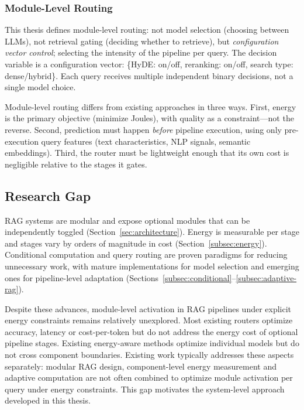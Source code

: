 
\subsubsection{Module-Level Routing}

This thesis defines module-level routing: not model selection (choosing between LLMs),
not retrieval gating (deciding whether to retrieve), but \emph{configuration 
vector control}; selecting the intensity of the pipeline per query. The decision 
variable is a configuration vector: \{HyDE: on/off, reranking: on/off, search type: 
dense/hybrid\}. Each query receives multiple independent binary decisions, not a 
single model choice.

Module-level routing differs from existing approaches in three ways. First,
energy is the primary objective (minimize Joules), with quality as a constraint---not 
the reverse. Second, prediction must happen \emph{before} pipeline execution, using 
only pre-execution query features (text characteristics, NLP signals, semantic 
embeddings). Third, the router must be lightweight enough that its own cost is 
negligible relative to the stages it gates.



\subsection{Research Gap}

RAG systems are modular and expose optional modules that can be independently
toggled (Section~\ref{sec:architecture}). Energy is measurable per stage and stages vary by orders
of magnitude in cost (Section~\ref{subsec:energy}). Conditional computation and query routing
are proven paradigms for reducing unnecessary work, with mature implementations
for model selection and emerging ones for pipeline-level adaptation
(Sections~\ref{subsec:conditional}--\ref{subsec:adaptive-rag}).

Despite these advances, module-level activation in RAG pipelines under explicit 
energy constraints remains relatively unexplored. Most existing routers optimize accuracy, latency or 
cost-per-token but do not address the energy cost of optional pipeline stages. 
Existing energy-aware methods optimize individual models but do not cross component 
boundaries. Existing work typically addresses these aspects separately:
modular RAG design, component-level energy measurement and adaptive computation
are not often combined to optimize module activation per query under energy constraints. 
This gap motivates the system-level approach developed in this thesis.



